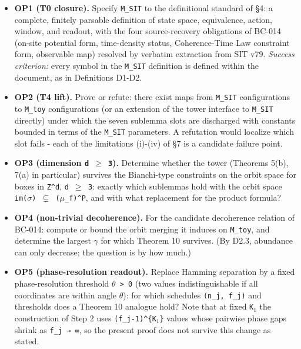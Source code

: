 \documentclass[
  american,
  11pt,
  letterpaper,
]{article}
\providecommand{\tightlist}{%
  \setlength{\itemsep}{0pt}\setlength{\parskip}{0pt}}
\begin{document}
\begin{itemize}
\tightlist
\item
  \textbf{OP1 (T0 closure).} Specify \texttt{M\_SIT} to the definitional standard of §4: a complete, finitely parsable definition of state space, equivalence, action, window, and readout, with the four source-recovery obligations of BC-014 (on-site potential form, time-density status, Coherence-Time Law constraint form, observable map) resolved by verbatim extraction from SIT v79. \emph{Success criterion:} every symbol in the \texttt{M\_SIT} definition is defined within the document, as in Definitions D1-D2.
\item
  \textbf{OP2 (T4 lift).} Prove or refute: there exist maps from \texttt{M\_SIT} configurations to \texttt{M\_toy} configurations (or an extension of the tower interface to \texttt{M\_SIT} directly) under which the seven sublemma slots are discharged with constants bounded in terms of the \texttt{M\_SIT} parameters. A refutation would localize which slot fails - each of the limitations (i)-(iv) of §7 is a candidate failure point.
\item
  \textbf{OP3 (dimension \texttt{d\ \ensuremath{\geq}\ 3}).} Determine whether the tower (Theorems 5(b), 7(a) in particular) survives the Bianchi-type constraints on the orbit space for boxes in \texttt{Z\^{}d}, \texttt{d\ \ensuremath{\geq}\ 3}: exactly which sublemmas hold with the orbit space \texttt{im(\ensuremath{\sigma})\ \ensuremath{\subsetneq}\ (\ensuremath{\mu}\_f)\^{}P}, and with what replacement for the product formula?
\item
  \textbf{OP4 (non-trivial decoherence).} For the candidate decoherence relation of BC-014: compute or bound the orbit merging it induces on \texttt{M\_toy}, and determine the largest \texttt{\ensuremath{\gamma}} for which Theorem 10 survives. (By D2.3, abundance can only decrease; the question is by how much.)
\item
  \textbf{OP5 (phase-resolution readout).} Replace Hamming separation by a fixed phase-resolution threshold \texttt{\ensuremath{\theta}\ \textgreater{}\ 0} (two values indistinguishable if all coordinates are within angle \texttt{\ensuremath{\theta}}): for which schedules \texttt{(n\_j,\ f\_j)} and thresholds does a Theorem 10 analogue hold? Note that at fixed \texttt{K\ensuremath{{}_{1}}} the construction of Step 2 uses \texttt{(f\_j-1)\^{}\{K\ensuremath{{}_{1}}\}} values whose pairwise phase gaps shrink as \texttt{f\_j\ →\ ∞}, so the present proof does not survive this change as stated.
\end{itemize}
\end{document}
